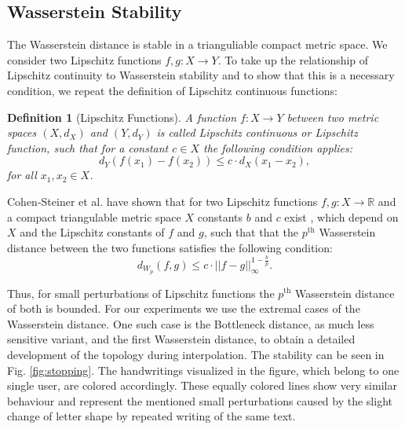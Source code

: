 \documentclass[journal]{IEEEtran}
\newtheorem{definition}{Definition}[section]
\begin{document}
\subsection{Wasserstein Stability}
The Wasserstein distance is stable in a trianguliable compact metric space. We consider two Lipschitz functions $f,g: X \rightarrow Y$. To take up the relationship of Lipschitz continuity to Wasserstein stability and to show that this is a necessary condition, we repeat the definition of Lipschitz continuous functions:
\begin{definition}[Lipschitz Functions]
A function $f: X \rightarrow Y$ between two metric spaces $(X,d_X)$ and $(Y,d_Y)$ is called Lipschitz continuous or Lipschitz function, such that for a constant $c \in X$ the following condition applies:
\[
d_Y(f(x_1) - f(x_2)) \leq c \cdot d_X(x_1-x_2),
\] for all $x_1, x_2 \in X$.
\end{definition}
Cohen-Steiner et al. have shown that for two Lipschitz functions $f,g: X \rightarrow \mathbb{R}$ and a compact triangulable metric space $X$ constants $b$ and $c$ exist  \cite{cohen2010lipschitz}, which depend on $X$ and the Lipschitz constants of $f$ and $g$, such that that the $p^{\text{th}}$ Wasserstein distance between the two functions satisfies the following condition:
\begin{equation}
  d_{W_p}(f,g) \leq c \cdot ||f-g||_\infty^{1-\frac{b}{p}}.
\end{equation}

Thus, for small perturbations of Lipschitz functions the $p^{\text{th}}$ Wasserstein distance of both is bounded. For our experiments we use the extremal cases of the Wasserstein distance. One such case is the Bottleneck distance, as much less sensitive variant, and the first Wasserstein distance, to obtain a detailed development of the topology during interpolation. The stability can be seen in Fig. \ref{fig:stopping}. The handwritings visualized in the figure, which belong to one single user, are colored accordingly. These equally colored lines show very similar behaviour and represent the mentioned small perturbations caused by the slight change of letter shape by repeated writing of the same text.
\end{document}
